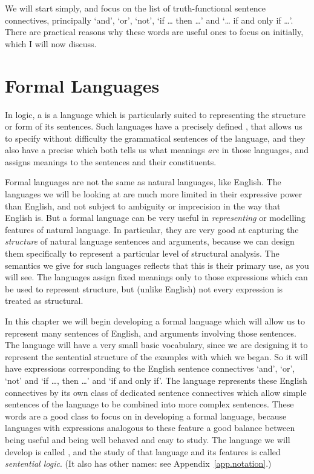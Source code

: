 We will start simply, and focus on the list of truth-functional sentence connectives, principally `and', `or', `not', `if … then …' and `… if and only if …'. There are practical reasons why these words are useful ones to focus on initially, which I will now discuss.

\section{Formal Languages}

In logic, a  is a language which is particularly suited to representing the structure or form of its sentences. Such languages have a precisely defined , that allows us to specify without difficulty the grammatical sentences of the language, and they also have a precise  which both tells us what meanings \emph{are} in those languages, and assigns meanings to the sentences and their constituents. 

Formal languages are not the same as natural languages, like English. The languages we will be looking at are much more limited in their expressive power than English, and not subject to ambiguity or imprecision in the way that English is. But a formal language can be very useful in \emph{representing} or modelling features of natural language. In particular, they are very good at capturing the \emph{structure} of natural language sentences and arguments, because we can design them specifically to represent a particular level of structural analysis. The semantics we give for such languages reflects that this is their primary use, as you will see. The languages assign fixed meanings only to those expressions which can be used to represent structure, but (unlike English) not every expression is treated as structural.

In this chapter we will begin developing a formal language which will allow us to represent many sentences of English, and arguments involving those sentences. The language will have a very small basic vocabulary, since we are designing it to represent the sentential structure of the examples with which we began. So it will have expressions corresponding to the English sentence  connectives `and', `or', `not' and `if …, then …' and `if and only if'. The language represents these English connectives by its own class of dedicated sentence connectives which allow simple sentences of the language to be combined into more complex sentences. These words are a good class to focus on in developing a formal language, because languages with expressions analogous to these feature a good balance between being useful and being well behaved and easy to study. The language we will develop is called \TFL, and the study of that language and its features is called \emph{sentential logic}. (It also has other names: see Appendix~\ref{app.notation}.) 

